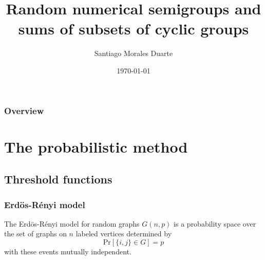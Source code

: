 \documentclass{beamer}
\title[Random numerical semigroups]{Random numerical semigroups and sums of subsets of cyclic groups} %
\author{Santiago Morales Duarte} %
\institute[Uniandes] %
{
Universidad de los Andes\\ %
\medskip
\textit{s.morales30@uniandes.edu.co} %
}
\date{\today} %
\def\Pr{\ensuremath{\mathrm{Pr}}}
\begin{document}
\begin{frame}
\titlepage %
\end{frame}

\begin{frame}
\frametitle{Overview} %
\tableofcontents %
\end{frame}


\section{The probabilistic method} %

\subsection{Threshold functions} %

\begin{frame}
\frametitle{Erdös-Rényi model}
\begin{definition}\label{def:probmet:ermodel}
    The Erdös-Rényi model for random graphs $G(n, p)$ is a probability space over the set of graphs on $n$ labeled vertices determined by
    \[\Pr[\{i, j\} \in G] = p\] 
    with these events mutually independent.
\end{definition}
\end{frame}
\end{document}

